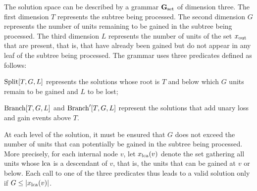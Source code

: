 The solution space can be described by a grammar \(\mathbf{G}_{\mathrm{set}}\) of dimension three.
The first dimension \(T\) represents the subtree being processed.
The second dimension \(G\) represents the number of units remaining to be gained in the subtree being processed.
The third dimension \(L\) represents the number of units of the set \(x_{\mathrm{out}}\) that are present, that is, that have already been gained but do not appear in any leaf of the subtree being processed.
The grammar uses three predicates defined as follows:
\begin{compactitemize}
    \item \(\mathrm{Split}[T, G, L]\) represents the solutions whose root is \(T\) and below which \(G\) units remain to be gained and \(L\) to be lost;
    \item \(\mathrm{Branch}[T, G, L]\) and \(\mathrm{Branch}'[T, G, L]\) represent the solutions that add unary loss and gain events above \(T\).
\end{compactitemize}
At each level of the solution, it must be ensured that \(G\) does not exceed the number of units that can potentially be gained in the subtree being processed.
More precisely, for each internal node \(v\), let \(x_{\mathrm{lca}}(v)\) denote the set gathering all units whose \(\mathrm{lca}\) is a descendant of \(v\), that is, the units that can be gained at \(v\) or below.
Each call to one of the three predicates thus leads to a valid solution only if \(G \le |x_{\mathrm{lca}}(v)|\).

